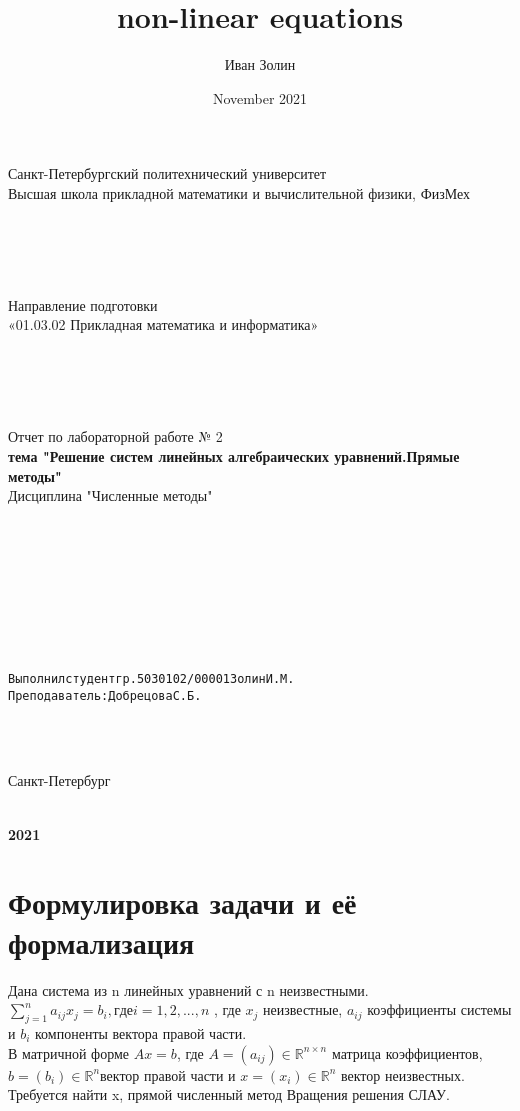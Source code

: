 \documentclass{article}
\title{non-linear equations}
\author{Иван Золин}
\date{November 2021}
\begin{document}
	
	\large
	\begin{center}
		
		Санкт-Петербургский политехнический университет\\
		Высшая школа прикладной математики и вычислительной физики, ФизМех
		
		~\\
		~\\
		~\\
		~\\
		Направление подготовки\\
		«01.03.02 Прикладная математика и информатика»
		
		~\\
		~\\
		~\\
		~\\
		Отчет по лабораторной работе № 2\\
		\textbf{тема "Решение систем линейных алгебраических уравнений.Прямые методы"}	
		~\\	Дисциплина "Численные методы"
	\end{center}
	
	~\\
	~\\
	~\\
	~\\
	~\\
	~\\
	~\\
	\begin{alltt}
		Выполнил студент гр. 5030102/00001			  		   		  Золин И.М.
		Преподаватель: 				              	        	Добрецова С.Б.
	\end{alltt}
	
	~\\
	~\\
	\begin{center}
		Санкт-Петербург
		
		~\\
		\textbf{2021}
	\end{center}{}
	
	\newpage
	
	\section{Формулировка задачи и её формализация}
		Дана система из n линейных уравнений с n неизвестными.
	$\sum\limits_{j=1}^{n}{a_{ij}x_j}=b_i, где i = 1,2,...,n$ , где $x_j$ неизвестные, $a_{ij}$ коэффициенты системы и $b_i$ компоненты вектора правой
	части.
	~\\
	В матричной форме $Ax = b$, где $A = (a_{ij}) \in \mathbb{R}^{n\times n} $ матрица коэффициентов, $b = (b_i) \in \mathbb{R}^n $вектор правой части и $x = (x_i) \in \mathbb{R}^n$  вектор неизвестных.
	Требуется найти x, прямой численный метод Вращения решения СЛАУ.
	
\end{document}
